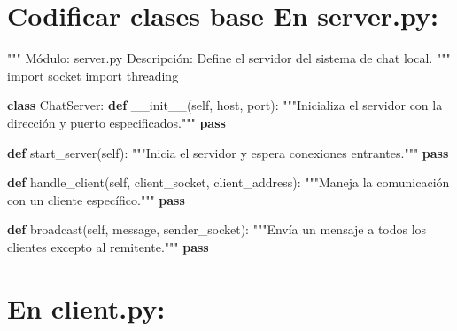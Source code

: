 \documentclass[
  a4paper,
  DIV=11,
  numbers=noendperiod,
  onepage,
  openany]{scrreprt}
\newenvironment{Shaded}{\begin{snugshade}}{\end{snugshade}}
\newcommand{\CommentTok}[1]{\textcolor[rgb]{0.37,0.37,0.37}{#1}}
\newcommand{\ControlFlowTok}[1]{\textcolor[rgb]{0.00,0.23,0.31}{\textbf{#1}}}
\newcommand{\FunctionTok}[1]{\textcolor[rgb]{0.28,0.35,0.67}{#1}}
\newcommand{\ImportTok}[1]{\textcolor[rgb]{0.00,0.46,0.62}{#1}}
\newcommand{\KeywordTok}[1]{\textcolor[rgb]{0.00,0.23,0.31}{\textbf{#1}}}
\newcommand{\NormalTok}[1]{\textcolor[rgb]{0.00,0.23,0.31}{#1}}
\newcommand{\VariableTok}[1]{\textcolor[rgb]{0.07,0.07,0.07}{#1}}
\begin{document}
\section{Codificar clases base En
server.py:}\label{codificar-clases-base-en-server.py}

\begin{Shaded}
\begin{Highlighting}[]
\CommentTok{"""}
\CommentTok{Módulo: server.py}
\CommentTok{Descripción: Define el servidor del sistema de chat local.}
\CommentTok{"""}
\ImportTok{import}\NormalTok{ socket}
\ImportTok{import}\NormalTok{ threading}

\KeywordTok{class}\NormalTok{ ChatServer:}
    \KeywordTok{def} \FunctionTok{\_\_init\_\_}\NormalTok{(}\VariableTok{self}\NormalTok{, host, port):}
        \CommentTok{"""Inicializa el servidor con la dirección y puerto especificados."""}
        \ControlFlowTok{pass}

    \KeywordTok{def}\NormalTok{ start\_server(}\VariableTok{self}\NormalTok{):}
        \CommentTok{"""Inicia el servidor y espera conexiones entrantes."""}
        \ControlFlowTok{pass}

    \KeywordTok{def}\NormalTok{ handle\_client(}\VariableTok{self}\NormalTok{, client\_socket, client\_address):}
        \CommentTok{"""Maneja la comunicación con un cliente específico."""}
        \ControlFlowTok{pass}

    \KeywordTok{def}\NormalTok{ broadcast(}\VariableTok{self}\NormalTok{, message, sender\_socket):}
        \CommentTok{"""Envía un mensaje a todos los clientes excepto al remitente."""}
        \ControlFlowTok{pass}
\end{Highlighting}
\end{Shaded}

\section{En client.py:}\label{en-client.py}
\end{document}

